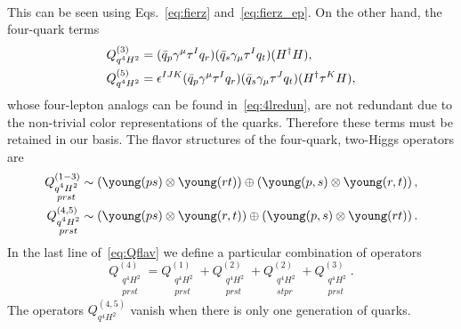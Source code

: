 \begin{enumerate}
\begin{align}
\end{align}
This can be seen using Eqs.~\eqref{eq:fierz} and~\eqref{eq:fierz_ep}.
On the other hand, the four-quark terms 
\begin{align}
Q_{q^4H^2}^{(3)} &= (\bar q_p \gamma^\mu \tau^I q_r) (\bar q_s \gamma_\mu \tau^I q_t) (H^\dag H) , \nonumber\\ 
Q_{q^4H^2}^{(5)} &= \epsilon^{IJK} (\bar q_p \gamma^\mu \tau^I q_r) (\bar q_s \gamma_\mu \tau^J q_t) (H^\dag \tau^K H) ,
\end{align}
whose four-lepton analogs can be found in~\eqref{eq:4lredun}, are not redundant due to the non-trivial color representations of the quarks.
Therefore these terms must be retained in our basis.
The flavor structures of the four-quark, two-Higgs operators are
\begin{align}
\label{eq:Qflav}
Q_{\substack{q^4H^2 \\ prst}}^{(1-3)} &\sim \left(\young(ps) \otimes \young(rt)\right) \oplus \left(\young(p,s) \otimes \young(r,t)\right) , \nn
Q_{\substack{q^4H^2 \\ prst}}^{(4, 5)} &\sim \left(\young(ps) \otimes \young(r,t)\right) \oplus \left(\young(p,s) \otimes \young(rt)\right) .
\end{align}
In the last line of~\eqref{eq:Qflav} we define a particular combination of operators
\begin{equation}
Q_{\substack{q^4H^2 \\ prst}}^{(4)} = Q_{\substack{q^4H^2 \\ prst}}^{(1)} + Q_{\substack{q^4H^2 \\ prst}}^{(2)} + Q_{\substack{q^4H^2 \\ stpr}}^{(2)} + Q_{\substack{q^4H^2 \\ prst}}^{(3)} .
\end{equation}
The operators $Q_{q^4H^2}^{(4, 5)}$ vanish when there is only one generation of quarks.


\end{enumerate}
